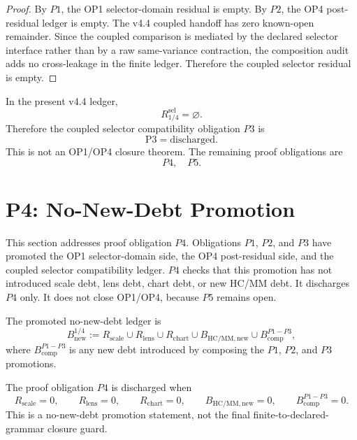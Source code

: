 \begin{proof}
By \(P1\), the OP1 selector-domain residual is empty.  By \(P2\), the OP4
post-residual ledger is empty.  The v4.4 coupled handoff has zero known-open
remainder.  Since the coupled comparison is mediated by the declared selector
interface rather than by a raw same-variance contraction, the composition audit
adds no cross-leakage in the finite ledger.  Therefore the coupled selector
residual is empty.
\end{proof}

\begin{theorem}[P3 discharge]
In the present v4.4 ledger,
\[
    R_{1/4}^{\mathrm{sel}}=\varnothing.
\]
Therefore the coupled selector compatibility obligation \(P3\) is
\[
    \mathrm{P3}=\mathrm{discharged}.
\]
This is not an OP1/OP4 closure theorem.  The remaining proof obligations are
\[
    P4,\quad P5.
\]
\end{theorem}



\section{P4: No-New-Debt Promotion}
\label{sec:v45-p4-no-new-debt-promotion}

This section addresses proof obligation \(P4\).  Obligations \(P1\), \(P2\),
and \(P3\) have promoted the OP1 selector-domain side, the OP4 post-residual
side, and the coupled selector compatibility ledger.  \(P4\) checks that this
promotion has not introduced scale debt, lens debt, chart debt, or new HC/MM
debt.  It discharges \(P4\) only.  It does not close OP1/OP4, because \(P5\)
remains open.

\begin{definition}
The promoted no-new-debt ledger is
\[
    B_{\mathrm{new}}^{1/4}
    :=
    R_{\mathrm{scale}}
    \cup
    R_{\mathrm{lens}}
    \cup
    R_{\mathrm{chart}}
    \cup
    B_{\mathrm{HC/MM,new}}
    \cup
    B_{\mathrm{comp}}^{P1-P3},
\]
where \(B_{\mathrm{comp}}^{P1-P3}\) is any new debt introduced by composing the
\(P1\), \(P2\), and \(P3\) promotions.
\end{definition}

\begin{definition}
The proof obligation \(P4\) is discharged when
\[
    R_{\mathrm{scale}}=0,\qquad
    R_{\mathrm{lens}}=0,\qquad
    R_{\mathrm{chart}}=0,\qquad
    B_{\mathrm{HC/MM,new}}=0,\qquad
    B_{\mathrm{comp}}^{P1-P3}=0.
\]
This is a no-new-debt promotion statement, not the final
finite-to-declared-grammar closure guard.
\end{definition}

